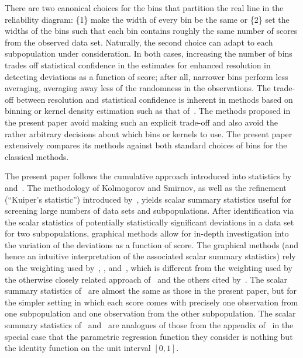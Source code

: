 \documentclass{article}
\begin{document}
There are two canonical choices for the bins that partition the real line
in the reliability diagram: \{1\} make the width of every bin be the same
or \{2\} set the widths of the bins such that each bin contains
roughly the same number of scores from the observed data set.
Naturally, the second choice can adapt to each subpopulation
under consideration. In both cases, increasing the number of bins
trades off statistical confidence in the estimates
for enhanced resolution in detecting deviations as a function of score;
after all, narrower bins perform less averaging, averaging away less
of the randomness in the observations.
The trade-off between resolution and statistical confidence
is inherent in methods based on binning or kernel density estimation
such as that of~\cite{srihera-stute}.
The methods proposed in the present paper avoid making
such an explicit trade-off and also avoid the rather arbitrary decisions
about which bins or kernels to use.
The present paper extensively compares its methods against
both standard choices of bins for the classical methods.

The present paper follows the cumulative approach introduced into statistics
by~\cite{kolmogorov} and~\cite{smirnov}.
The methodology of Kolmogorov and Smirnov,
as well as the refinement (``Kuiper's statistic'') introduced by~\cite{kuiper},
yields scalar summary statistics useful for screening large numbers
of data sets and subpopulations. After identification via the scalar statistics
of potentially statistically significant deviations in a data set
for two subpopulations, graphical methods allow for in-depth investigation
into the variation of the deviations as a function of score.
The graphical methods (and hence an intuitive interpretation
of the associated scalar summary statistics) rely on the weighting
used by~\cite{delgado}, \cite{diebolt}, and~\cite{stute},
which is different from the weighting used by the otherwise
closely related approach of~\cite{scheike} and the others
cited by~\cite{gonzalez-manteiga-crujeiras}.
The scalar summary statistics of~\cite{delgado} are almost the same
as those in the present paper, but for the simpler setting in which each score
comes with precisely one observation from one subpopulation
and one observation from the other subpopulation.
The scalar summary statistics of~\cite{diebolt} and~\cite{stute} are analogues
of those from the appendix of~\cite{tygert}
in the special case that the parametric regression function they consider
is nothing but the identity function on the unit interval $[0, 1]$.
\end{document}
